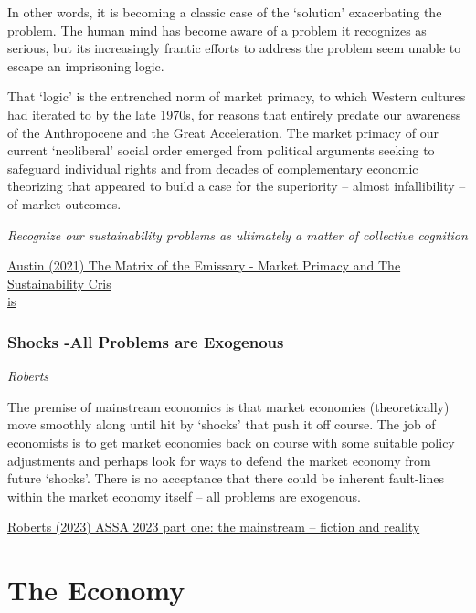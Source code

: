\documentclass[
]{book}
\begin{document}
In other words, it is becoming a classic case of the `solution' exacerbating the problem.
The human mind has become aware of a problem it recognizes as serious, but its increasingly frantic efforts to address the problem seem unable to escape an imprisoning logic.

That `logic' is the entrenched norm of market primacy, to which Western cultures had iterated to by the late 1970s, for reasons that entirely predate our awareness of the Anthropocene and the Great Acceleration. The market primacy of our current `neoliberal' social order emerged from political arguments seeking to safeguard individual rights and from decades of complementary economic theorizing that appeared to build a case for the superiority -- almost infallibility -- of market outcomes.

\emph{Recognize our sustainability problems as ultimately a matter of collective cognition}

\href{https://channelmcgilchrist.com/articles/the-matrix-of-the-emissary/}{Austin (2021) The Matrix of the Emissary - Market Primacy and The Sustainability Cris\\
is}

\hypertarget{shocks--all-problems-are-exogenous}{%
\subsection{Shocks -All Problems are Exogenous}\label{shocks--all-problems-are-exogenous}}

\emph{Roberts}

The premise of mainstream economics is that market economies (theoretically) move smoothly along until hit by `shocks' that push it off course. The job of economists is to get market economies back on course with some suitable policy adjustments and perhaps look for ways to defend the market economy from future `shocks'. There is no acceptance that there could be inherent fault-lines within the market economy itself -- all problems are exogenous.

\href{https://thenextrecession.wordpress.com/2023/01/10/assa-2023-part-one-the-mainstream-fiction-and-reality/}{Roberts (2023) ASSA 2023 part one: the mainstream -- fiction and reality}

\hypertarget{the-economy}{%
\chapter{The Economy}\label{the-economy}}
\end{document}
